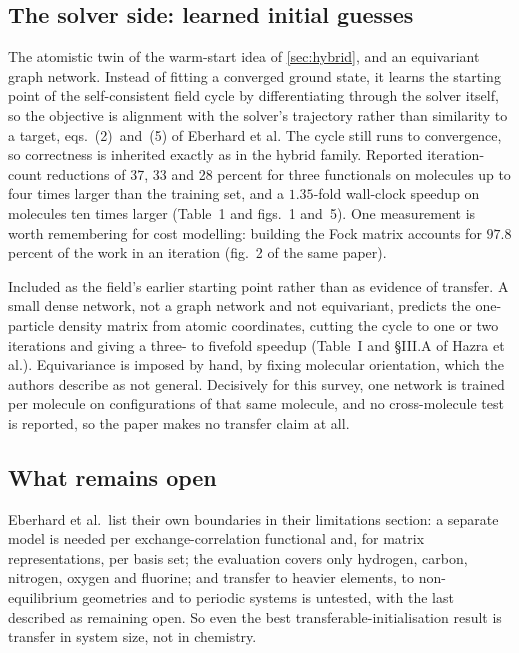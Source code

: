 \documentclass[11pt, a4paper]{article}
\begin{document}
\subsection{The solver side: learned initial guesses}

\begin{description}[style=nextline]
  \item[Eberhard et al., solver-aligned initialisation learning,
  SAIL~\citep{sail}]
  The atomistic twin of the warm-start idea of \cref{sec:hybrid}, and an
  equivariant graph network. Instead of fitting a converged ground state, it
  learns the starting point of the self-consistent field cycle by
  differentiating through the solver itself, so the objective is alignment
  with the solver's trajectory rather than similarity to a target,
  eqs.~(2)~and~(5) of Eberhard et al. The cycle still runs to convergence, so
  correctness is inherited exactly as in the hybrid family. Reported
  iteration-count reductions of 37, 33 and 28 percent for three functionals on
  molecules up to four times larger than the training set, and a $1.35$-fold
  wall-clock speedup on molecules ten times larger (Table~1 and figs.~1
  and~5). One measurement is worth remembering for cost modelling: building
  the Fock matrix accounts for $97.8$ percent of the work in an iteration
  (fig.~2 of the same paper).
  \item[Hazra, Patil and Sanvito~\citep{densitymatrix}]
  Included as the field's earlier starting point rather than as evidence of
  transfer. A small dense network, not a graph network and not equivariant,
  predicts the one-particle density matrix from atomic coordinates, cutting
  the cycle to one or two iterations and giving a three- to fivefold speedup
  (Table~I and \S{}III.A of Hazra et al.). Equivariance is imposed by hand,
  by fixing molecular orientation, which the authors describe as not general.
  Decisively for this survey, one network is trained per molecule on
  configurations of that same molecule, and no cross-molecule test is
  reported, so the paper makes no transfer claim at all.
\end{description}

\subsection{What remains open}

Eberhard et al.\ list their own boundaries in their limitations section: a
separate model is needed per exchange-correlation functional and, for matrix
representations, per basis set; the evaluation covers only hydrogen, carbon,
nitrogen, oxygen and fluorine; and transfer to heavier elements, to
non-equilibrium geometries and to periodic systems is untested, with the last
described as remaining open. So even the best transferable-initialisation
result is transfer in system size, not in chemistry.
\end{document}
